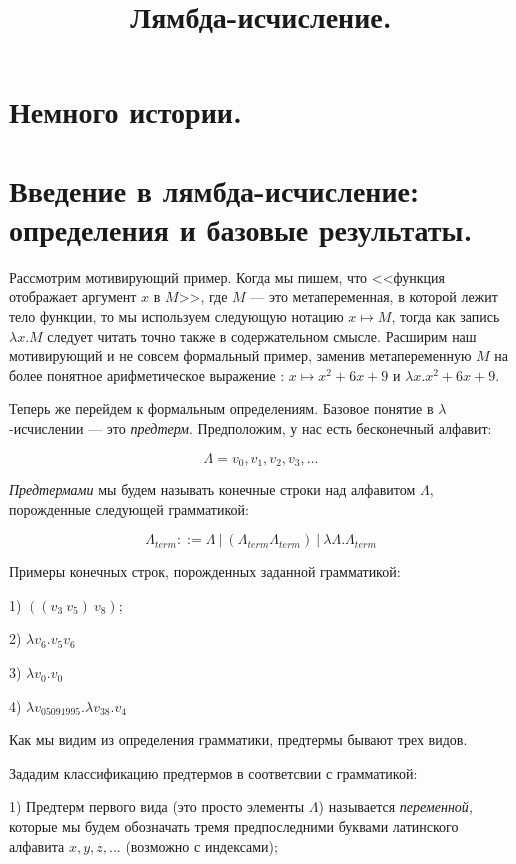 \documentclass[a4paper]{article}
\begin{document}
\title{Лямбда-исчисление.}
\section{Немного истории.}
\section{Введение в лямбда-исчисление: определения и базовые результаты.}

Рассмотрим мотивирующий пример. Когда мы пишем, что <<функция отображает аргумент $x$ в $M$>>, где $M$ --- это метапеременная,
в которой лежит тело функции, то мы используем следующую нотацию $x \mapsto M$, тогда как запись $\lambda x.M$ следует читать точно
также в содержательном смысле. Расширим наш мотивирующий и не совсем формальный пример,
заменив метапеременную $M$ на более понятное арифметическое выражение : $x \mapsto x^2 + 6x + 9$ и $\lambda x.x^2 + 6x + 9$.

Теперь же перейдем к формальным определениям. Базовое понятие в $\lambda$-исчислении --- это \emph{предтерм}. Предположим, у нас есть бесконечный алфавит:

\begin{equation}
\Lambda = {v_0, v_1, v_2, v_3, ... }
\end{equation}

\emph{Предтермами} мы будем называть конечные строки над алфавитом $\Lambda$, порожденные следующей грамматикой:

\begin{equation}
\Lambda_{term} ::= \Lambda \: | \: (\Lambda_{term} \Lambda_{term}) \: | \: \lambda \Lambda . \Lambda_{term}
\end{equation}

Примеры конечных строк, порожденных заданной грамматикой:

1) $((v_3 \: v_5) \: v_8)$;

2) $\lambda v_6. v_5 v_6$

3) $\lambda v_0. v_0$

4) $\lambda v_{05091995}.\lambda v_{38}.v_{4}$


Как мы видим из определения грамматики, предтермы бывают трех видов.

Зададим классификацию предтермов в соответсвии с грамматикой:

1) Предтерм первого вида (это просто элементы $\Lambda$) называется \emph{переменной}, которые мы будем обозначать тремя предпоследними буквами
латинского алфавита $x, y, z, ...$ (возможно с индексами);
\end{document}
